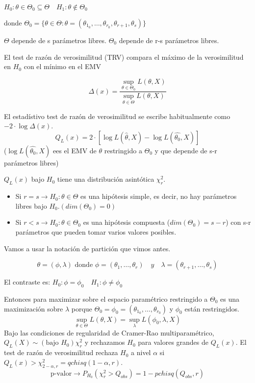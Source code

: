 \(
H_0: \theta \in \Theta_0 \subseteq \Theta \quad H_1: \theta \notin \Theta_0
\)

donde $\Theta_0=\{
    \theta \in \Theta: \theta=(\theta_{1_0},\dots,\theta_{r_0},\theta_{r+1},\theta_s)
\}$

$\Theta$ depende de s parámetros libres. $\Theta_0$ depende de r-s parámetros libres.

El test de razón de verosimilitud (TRV) compara el máximo de la verosimilitud en $H_0$ con el mínimo en el EMV

\[
\Delta(x)=\frac{\sup_{\theta \in \Theta_0} L(\theta,X)}{\sup_{\theta \in \Theta} L(\theta,X)}
\]

El estadístivo test de razón de verosimilitud se escribe habitualmente como $-2 \cdot \log \Delta(x)$.
\[
Q_L(x)=2 \cdot [\log L(\hat{\theta},X)-\log L(\hat{\theta_0},X)]
\]
($\log L(\hat{\theta_0},X)$ ees el EMV de $\theta$ restringido a $\Theta_0$ y que depende de s-r parámetros libres)

$Q_L(x)$ bajo $H_0$ tiene una distribución asintótica $\chi^2_r$.
\begin{itemize}
    \item Si $r=s \to H_0:\theta \in \Theta$ es una hipótesis simple, es decir, no hay parámetros libres bajo $H_0.(dim(\Theta_0)=0)$
    \item Si $r<s \to H_0:\theta \in \Theta_0$ es una hipótesis compuesta ($dim(\Theta_0)=s-r$) con s-r parámetros que pueden tomar varios valores posibles.
\end{itemize}

Vamos a usar la notación de partición que vimos antes.

\[
\theta=(\phi,\lambda) \text{ donde } \phi=(\theta_1,\dots,\theta_r) \quad y \quad \lambda=(\theta_{r+1},\dots,\theta_s)
\]

El contraste es: $H_0:\phi=\phi_0 \quad H_1:\phi \neq \phi_0$

Entonces para maximizar sobre el espacio paramétrico restringido a $\Theta_0$ es una maximización sobre $\lambda$ porque
$\Theta_0=\phi_0=(\theta_{1_0},\dots,\theta_{r_0})$ y $\phi_0$ están restringidos.
$$\sup_{\theta \in \Theta}L(\theta,X)=\sup_\lambda L(\phi_0,\lambda,X)$$
\newpage
Bajo las condiciones de regularidad de Cramer-Rao multiparamétrico, $Q_L(X) \sim (\text{bajo }H_0) \chi^2_r$
y rechazamos $H_0$ para valores grandes de $Q_L(x)$. El test de razón de verosimilitud rechaza $H_0$ a nivel $\alpha$ si $Q_L(x)>\chi^2_{2-\alpha,r}=qchisq(1-\alpha,r)$.
\[
\text{p-valor} \to P_{H_0}(\chi^2_r>Q_{obs})=1-pchisq(Q_{obs},r)
\]
